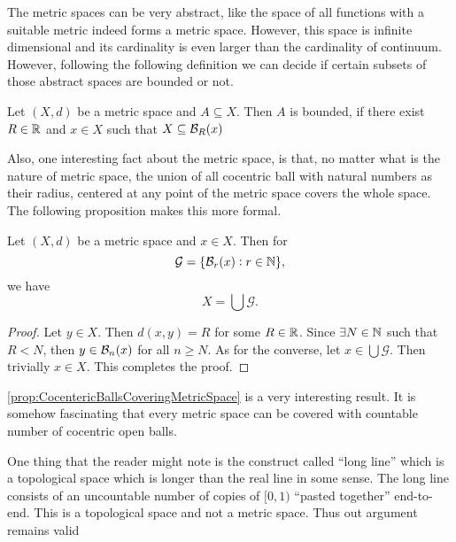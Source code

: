 The metric spaces can be very abstract, like the space of all functions with a suitable metric indeed forms a metric space. However, this space is infinite dimensional and its cardinality is even larger than the cardinality of continuum. However, following the following definition we can decide if certain subsets of those abstract spaces are bounded or not.
\begin{definition}
	Let $(X,d)$ be a metric space and $A \subseteq X$. Then $A$ is bounded, if there exist $R \in \mathbb{R}$ and $x \in X$ such that $X \subseteq \mathcal{B}_{R}(x)$
\end{definition}


Also, one interesting fact about the metric space, is that, no matter what is the nature of metric space, the union of all cocentric ball with natural numbers as their radius, centered at any point of the metric space covers the whole space. The following proposition makes this more formal.

\begin{proposition}
	\label{prop:CocentericBallsCoveringMetricSpace}
	Let $(X,d)$ be a metric space and $x \in X$. Then for 
	\[ \mathcal{G} = \{ \mathcal{B}_{r}(x): r \in \mathbb{N} \}, \]
	we have
	\[ X = \bigcup \mathcal{G}. \]
\end{proposition}
\begin{proof}
	Let $y \in X$. Then $d(x,y) = R$ for some $R \in \mathbb{R}$. Since $\exists N \in \mathbb{N}$ such that $R < N$, then $y \in \mathcal{B}_{n}(x)$ for all $n \geq N$. As for the converse, let $x \in \bigcup \mathcal{G}$. Then trivially $x \in X$. This completes the proof.
\end{proof}

\autoref{prop:CocentericBallsCoveringMetricSpace} is a very interesting result. It is somehow fascinating that every metric space can be covered with countable number of cocentric open balls. 


\begin{remark}
	One thing that the reader might note is the construct called ``long line'' which is a topological space which is longer than the real line in some sense. The long line consists of an uncountable number of copies of $[0,1)$ ``pasted together'' end-to-end. This is a topological space and not a metric space. Thus out argument remains valid
\end{remark} 


